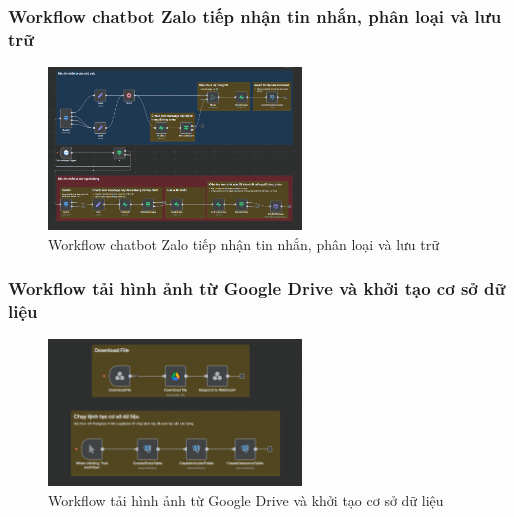 \subsubsection{Workflow chatbot Zalo tiếp nhận tin nhắn, phân loại và lưu trữ}

\begin{figure}[H]
    \centering
    \includegraphics[width=0.6\textwidth]{img/Picture16.png}
    \caption{Workflow chatbot Zalo tiếp nhận tin nhắn, phân loại và lưu trữ}
    \label{fig:chatbot-luutru}
\end{figure}

\subsubsection{Workflow tải hình ảnh từ Google Drive và khởi tạo cơ sở dữ liệu}

\begin{figure}[H]
    \centering
    \includegraphics[width=0.6\textwidth]{img/Picture17.png}
    \caption{Workflow tải hình ảnh từ Google Drive và khởi tạo cơ sở dữ liệu}
    \label{fig:chatbot-drive}
\end{figure}



